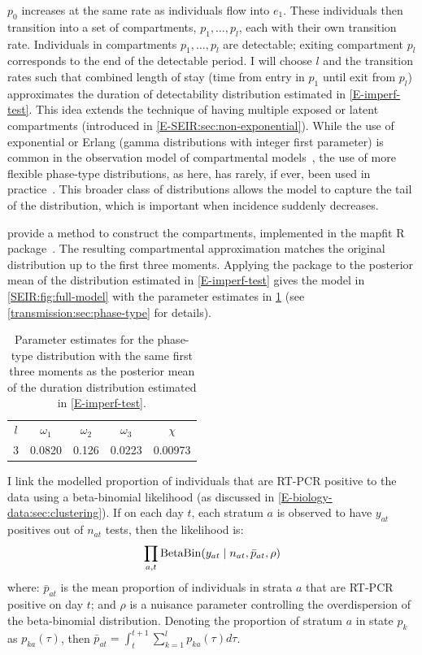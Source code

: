 \documentclass[thesis.tex]{subfiles}
\begin{document}
$p_0$ increases at the same rate as individuals flow into $e_1$.
These individuals then transition into a set of compartments, $p_1, \dots, p_l$, each with their own transition rate.
Individuals in compartments $p_1, \dots, p_l$ are detectable; exiting compartment $p_l$ corresponds to the end of the detectable period.
I will choose $l$ and the transition rates such that combined length of stay (\ie time from entry in $p_1$ until exit from $p_l$) approximates the duration of detectability distribution estimated in \cref{E-imperf-test}.
This idea extends the technique of having multiple exposed or latent compartments (introduced in \cref{E-SEIR:sec:non-exponential}).
While the use of exponential or Erlang (gamma distributions with integer first parameter) is common in the observation model of compartmental models~\autocite[e.g.][]{overtonEpiBeds}, the use of more flexible phase-type distributions, as here, has rarely, if ever, been used in practice~\autocite{hurtadoGLCT}.
This broader class of distributions allows the model to capture the tail of the distribution, which is important when incidence suddenly decreases.

\Textcite{osogamiClosed} provide a method to construct the compartments, implemented in the mapfit R package~\autocite{mapfit}. 
The resulting compartmental approximation matches the original distribution up to the first three moments.
Applying the package to the posterior mean of the distribution estimated in \cref{E-imperf-test} gives the model in \cref{SEIR:fig:full-model} with the parameter estimates in \cref{SEIR:table:ec-params} (see \cref{transmission:sec:phase-type} for details).
\begin{table}
    \centering
    \begin{tabular}{c c c c c}
        $l$ & $\omega_1$ & $\omega_{2}$ & $\omega_{3}$ & $\chi$ \\
        3 & 0.0820 & 0.126 & 0.0223 & 0.00973  \\
    \end{tabular}
    \caption{Parameter estimates for the phase-type distribution with the same first three moments as the posterior mean of the duration distribution estimated in \cref{E-imperf-test}.}
    \label{SEIR:table:ec-params}
\end{table}

I link the modelled proportion of individuals that are RT-PCR positive to the data using a beta-binomial likelihood (as discussed in \cref{E-biology-data:sec:clustering}).
If on each day $t$, each stratum $a$ is observed to have $y_{at}$ positives out of $n_{at}$ tests, then the likelihood is:
\begin{align}
    \prod_{a,t} \operatorname{BetaBin} (y_{at} \mid n_{at}, \bar{p}_{at}, \rho)
    \label{SEIR:eq:likelihood}
\end{align}
where: $\bar{p}_{at}$ is the mean proportion of individuals in strata $a$ that are RT-PCR positive on day $t$; and $\rho$ is a nuisance parameter controlling the overdispersion of the beta-binomial distribution.
Denoting the proportion of stratum $a$ in state $p_k$ as $p_{ka}(\tau)$, then $\bar{p}_{at} = \int_{t}^{t+1} \sum_{k=1}^l p_{ka}(\tau) d\tau$.
\end{document}
